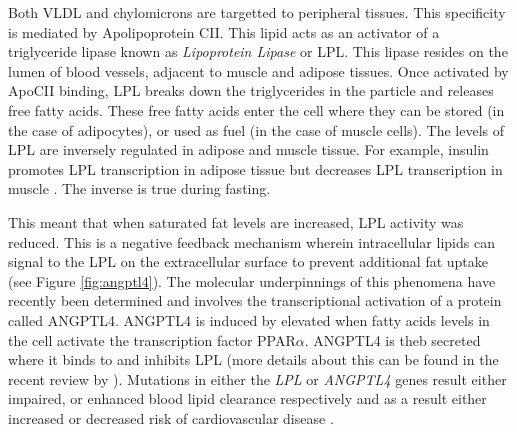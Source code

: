 \documentclass{tufte-handout}
\begin{document}
Both VLDL and chylomicrons are targetted to peripheral tissues.  This specificity is mediated by Apolipoprotein CII.  This lipid acts as an activator of a triglyceride lipase known as \emph{Lipoprotein Lipase} or LPL.  This lipase resides on the lumen of blood vessels, adjacent to muscle and adipose tissues.  Once activated by ApoCII binding, LPL breaks down the triglycerides in the particle and releases free fatty acids.  These free fatty acids enter the cell where they can be stored (in the case of adipocytes), or used as fuel (in the case of muscle cells).  The levels of LPL are inversely regulated in adipose and muscle tissue.  For example, insulin promotes LPL transcription in adipose tissue but decreases LPL transcription in muscle \citep{Spooners1979}.  The inverse is true during fasting.

  This meant that when saturated fat levels are increased, LPL activity was reduced.  This is a negative feedback mechanism wherein intracellular lipids can signal to the LPL on the extracellular surface to prevent additional fat uptake (see Figure \ref{fig:angptl4}).  The molecular underpinnings of this phenomena have recently been determined and involves the transcriptional activation of a protein called ANGPTL4.  ANGPTL4 is induced by elevated when fatty acids levels in the cell activate the transcription factor PPAR$\alpha$.  ANGPTL4 is theb secreted where it binds to and inhibits LPL (more details about this can be found in the recent review by \citet{Dijk2014}).  Mutations in either the \textit{LPL} or \textit{ANGPTL4} genes result either impaired, or enhanced blood lipid clearance respectively and as a result either increased or decreased risk of cardiovascular disease \citep{Article2016b}.
\end{document}
